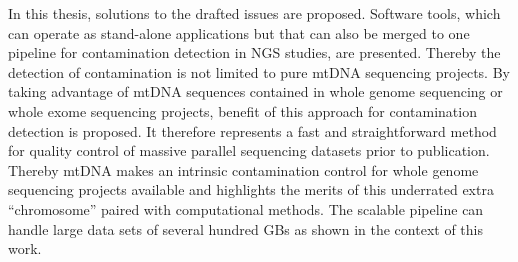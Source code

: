 In this thesis, solutions to the drafted issues are proposed. Software tools, which can operate as stand-alone applications but that can also be merged to one pipeline for contamination detection in NGS studies, are presented. Thereby the detection of contamination is not limited to pure mtDNA sequencing projects. By taking advantage of  mtDNA sequences contained in whole genome sequencing or whole exome sequencing projects, benefit of this approach for contamination detection is proposed. It therefore represents a fast and straightforward method for quality control of massive parallel sequencing datasets prior to publication. Thereby mtDNA makes an intrinsic contamination control for whole genome sequencing projects available and highlights the merits of this underrated extra “chromosome” paired with computational methods. The scalable pipeline can handle large data sets of several hundred GBs as shown in the context of this work. 

